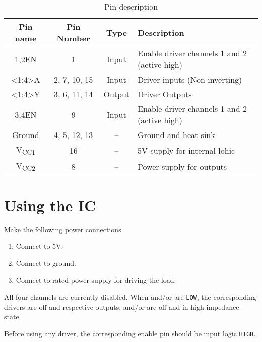\documentclass{article}
\begin{document}
	\begin{table}[h]
	\large
	\caption{Pin description}
		\begin{center}
		\begin{tabular}{|c|c|c|l|}
			\hline
			Pin name & Pin Number & Type & Description \\ \hline \hline
			1,2EN & 1 & Input & Enable driver channels 1 and 2 (active high) \\ \hline
			\textless{}1:4\textgreater{}A & 2, 7, 10, 15 & Input & Driver inputs (Non inverting) \\ \hline
			\textless{}1:4\textgreater{}Y & 3, 6, 11, 14 & Output & Driver Outputs \\ \hline
			3,4EN & 9 & Input & Enable driver channels 1 and 2 (active high) \\ \hline
			Ground & 4, 5, 12, 13 & -- & Ground and heat sink \\ \hline
			V\textsubscript{CC1} & 16 & -- & 5V supply for internal lohic \\ \hline
			V\textsubscript{CC2} & 8 & -- & Power supply for outputs \\ \hline
		\end{tabular}
		\end{center}
	\end{table}

\newpage

\section{Using the IC}

	Make the following power connections

	\begin{enumerate}
		\item Connect  to 5V.
		\item Connect  to ground.
		\item Connect  to rated power supply for driving the load.
	\end{enumerate}

	All four channels are currently disabled. When  and/or  are \texttt{LOW}, the corresponding drivers are off and respective outputs,  and/or  are off and in high impedance state.

	Before using any driver, the corresponding enable pin should  be input logic \texttt{HIGH}.
\end{document}
